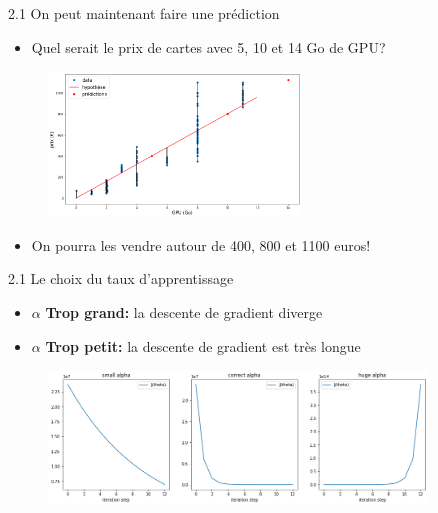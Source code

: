 \begin{frame}{2.1 On peut maintenant faire une prédiction}
  \begin{itemize}
  \item Quel serait le prix de cartes avec 5, 10 et 14 Go de GPU? 
  \end{itemize}
  \vspace{-0.2cm}
  \begin{figure}
    \includegraphics[width=0.6\textwidth]{figs/pred.png}
  \end{figure}
  \vspace{-0.5cm}
  \begin{itemize}
  \item On pourra les vendre autour de 400, 800 et 1100 euros!
  \end{itemize} 
\end{frame}

\begin{frame}{2.1 Le choix du taux d'apprentissage}
  \begin{itemize}
  \item \boldmath $\alpha$ \textbf{Trop grand:} la descente de gradient diverge
  \item \boldmath $\alpha$ \textbf{Trop petit:} la descente de gradient est très longue
  \end{itemize}
  \begin{figure}
    \includegraphics[width=0.9\textwidth]{figs/learningRateChoice.png}
  \end{figure}
\end{frame}

